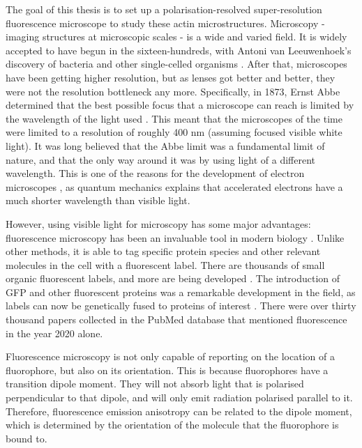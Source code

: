 The goal of this thesis is to set up a polarisation-resolved super-resolution fluorescence microscope to study these actin microstructures.	Microscopy - imaging structures at microscopic scales - is a wide and varied field. It is widely accepted to have begun in the sixteen-hundreds, with Antoni van Leeuwenhoek's discovery of bacteria and other single-celled organisms \cite{VanZuylen1981}. After that, microscopes have been getting higher resolution, but as lenses got better and better, they were not the resolution bottleneck any more. Specifically, in 1873, Ernst Abbe determined that the best possible focus that a microscope can reach is limited by the wavelength of the light used \cite{Abbe1873}. This meant that the microscopes of the time were limited to a resolution of roughly 400 nm (assuming focused visible white light). It was long believed that the Abbe limit was a fundamental limit of nature, and that the only way around it was by using light of a different wavelength. This is one of the reasons for the development of electron microscopes \cite{Smith2008}, as quantum mechanics explains that accelerated electrons have a much shorter wavelength than visible light. 

However, using visible light for microscopy has some major advantages: fluorescence microscopy has been an invaluable tool in modern biology \cite{Danial2016}. Unlike other methods, it is able to tag specific protein species and other relevant molecules in the cell with a fluorescent label. There are thousands of small organic fluorescent labels, and more are being developed \cite{Zhang2002, Resch-Genger2008}. The introduction of GFP and other fluorescent proteins was a remarkable development in the field, as labels can now be genetically fused to proteins of interest \cite{Shaner2005, Matlashov2020}. There were over thirty thousand papers collected in the PubMed database that mentioned fluorescence in the year 2020 alone.

Fluorescence microscopy is not only capable of reporting on the location of a fluorophore, but also on its orientation. This is because fluorophores have a transition dipole moment. They will not absorb light that is polarised perpendicular to that dipole, and will only emit radiation polarised parallel to it. Therefore, fluorescence emission anisotropy can be related to the dipole moment, which is determined by the orientation of the molecule that the fluorophore is bound to.

